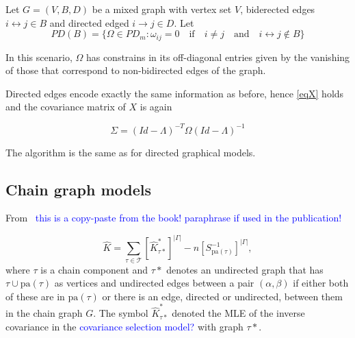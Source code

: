 \documentclass[10pt,a4paper]{article}
\begin{document}
Let $G=(V,B,D)$ be a mixed graph with vertex set $V$, biderected edges $i \leftrightarrow j \in B$ and directed edged $i \rightarrow j \in D$. Let 
\[PD(B) = \{ \Omega \in PD_m : \omega_{ij} = 0 \quad \text{if} \quad i \neq j\quad \text{and} \quad i \leftrightarrow j \notin B\}\]

In this scenario, $\Omega$ has constrains in its off-diagonal entries given by the vanishing of those that correspond to non-bidirected edges of the graph. 

Directed edges encode exactly the same information as before, hence {\ref{eqX}} holds and
the covariance matrix of $X$ is again

$$\Sigma=(Id-\Lambda)^{-T}\Omega(Id-\Lambda)^{-1}$$

The algorithm is the same as for directed graphical models.


\subsection{Chain graph models}
From~\cite[Section 5.4.1]{lauritzen1996graphical} \textcolor{blue}{this is a copy-paste from the book! paraphrase if used in the publication!}

\begin{equation}
\hat{K}=\sum\limits_{\tau \in \mathcal{T}}[\hat{K}^*_{\tau*}]^{|\Gamma|}-n[S_{\text{pa}(\tau)}^{-1}]^{|\Gamma|},
\end{equation}
where $\tau$ is a chain component and $\tau*$ denotes an undirected graph that has $\tau \cup \text{pa}(\tau)$ as vertices and undirected edges between a pair $(\alpha,\beta)$ if either both of these are in $\text{pa}(\tau)$ or there is an edge, directed or undirected, between them in the chain graph $G$. The symbol $\hat{K}^*_{\tau*}$ denoted the MLE of the inverse covariance in the \textcolor{blue}{covariance selection model?} with graph $\tau*$.  


\end{document}
